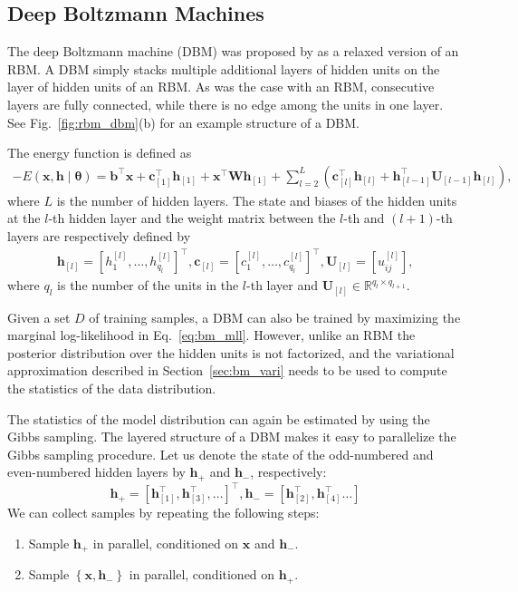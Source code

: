 \documentclass{now}
\newcommand{\qlay}[1]{\left[#1\right]}
\newcommand{\vect}[1]{\mathbf{#1}}
\newcommand{\vects}[1]{\boldsymbol{#1}}
\newcommand{\matr}[1]{\mathbf{#1}}
\newcommand{\vb}[0]{\vect{b}}
\newcommand{\vc}[0]{\vect{c}}
\newcommand{\vh}[0]{\vect{h}}
\newcommand{\vx}[0]{\vect{x}}
\newcommand{\mW}[0]{\matr{W}}
\newcommand{\mU}[0]{\matr{U}}
\newcommand{\TT}[0]{{\vects{\theta}}}
\newcommand{\RR}[0]{\mathbb{R}}
\begin{document}
\subsection{Deep Boltzmann Machines}
\label{sec:dbm}

The deep Boltzmann machine (DBM) was
proposed by \citet{Salakhutdinov2009a} as a relaxed version of an RBM.  A DBM
simply stacks multiple additional layers of hidden units on the layer of hidden
units of an RBM. As was the case with an RBM, consecutive layers are fully
connected, while there is no edge among the units in one layer. See
Fig.~\ref{fig:rbm_dbm}(b) for an example structure of a DBM.

The energy function is defined as
\begin{align}
    \label{eq:dbm_energy}
    -E(\vx, \vh \mid \TT) = \vb^\top \vx +
    \vc_{\qlay{1}}^\top \vh_{\qlay{1}}
    + \vx^\top \mW \vh_{\qlay{1}} + \sum_{l=2}^L \left(
    \vc_{\qlay{l}}^\top
    \vh_{\qlay{l}} + \vh_{\qlay{l-1}}^\top \mU_{\qlay{l-1}}
    \vh_{\qlay{l}} \right),
\end{align}
where $L$ is the number of hidden layers. The state and biases of the hidden
units at the $l$-th hidden layer and the weight matrix between the $l$-th and
$(l+1)$-th layers are respectively defined by
\begin{align*}
    \vh_{\qlay{l}} = \left[ h_{1}^{\qlay{l}}, \dots,
    h_{q_l}^{\qlay{l}} \right]^\top,
    \vc_{\qlay{l}} = \left[ c_{1}^{\qlay{l}}, \dots,
    c_{q_l}^{\qlay{l}} \right]^\top, 
    \mU_{\qlay{l}} = \left[ u_{ij}^{\qlay{l}} \right],
\end{align*}
where $q_l$ is the number of the units in the $l$-th layer and $\mU_{\qlay{l}}
\in \RR^{q_l \times q_{l+1}}$.

Given a set $D$ of training samples, a DBM can also be trained by maximizing the
marginal log-likelihood in Eq.~\eqref{eq:bm_mll}. However, unlike an RBM the
posterior distribution over the hidden units is not factorized, and the
variational approximation described in Section~\ref{sec:bm_vari} needs to be
used to compute the statistics of the data distribution. 

The statistics of the model distribution can again be estimated by using the
Gibbs sampling. The layered structure of a DBM makes it easy to parallelize the
Gibbs sampling procedure. Let us denote the state of the odd-numbered and
even-numbered hidden layers by $\vh_+$ and $\vh_-$, respectively:
\[
\vh_+=\left[\vh_{\qlay{1}}^\top,
\vh_{\qlay{3}}^\top, \dots \right]^\top, 
    \vh_- = \left[
    \vh_{\qlay{2}}^\top, \vh_{\qlay{4}}^\top \dots \right]
\]
We can collect samples by repeating the following steps:
\begin{enumerate}
    \itemsep 0em
    \item Sample $\vh_+$ in parallel, conditioned on $\vx$ and $\vh_-$.
    \item Sample $\left\{ \vx, \vh_- \right\}$ in parallel, conditioned on $\vh_+$.
\end{enumerate}
\end{document}
